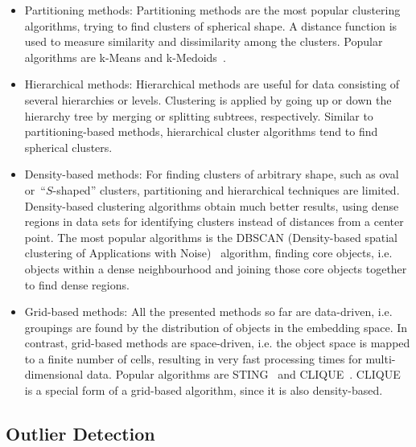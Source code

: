 \begin{itemize} 
\item Partitioning methods: Partitioning methods are the most popular clustering algorithms, trying to find clusters of spherical shape. A distance function is used to measure similarity and dissimilarity among the clusters. Popular algorithms are k-Means and k-Medoids~\parencite{medoid}. 
\item Hierarchical methods: Hierarchical methods are useful for data consisting of several hierarchies or levels. Clustering is applied by going up or down the hierarchy tree by merging or splitting subtrees, respectively. Similar to partitioning-based methods, hierarchical cluster algorithms tend to find spherical clusters. 
\item Density-based methods: For finding clusters of arbitrary shape, such as oval or~\enquote{$S$-shaped} clusters, partitioning and hierarchical techniques are limited. Density-based clustering algorithms obtain much better results, using dense regions in data sets for identifying clusters instead of distances from a center point. The most popular algorithms is the DBSCAN (Density-based spatial clustering of Applications with Noise)~\parencite{dbscan} algorithm, finding core objects, i.e. objects within a dense neighbourhood and joining those core objects together to find dense regions.
\item Grid-based methods: All the presented methods so far are data-driven, i.e. groupings are found by the distribution of objects in the embedding space. In contrast, grid-based methods are space-driven, i.e. the object space is mapped to a finite number of cells, resulting in very fast processing times for multi-dimensional data. Popular algorithms are STING~\parencite{sting} and CLIQUE~\parencite{clique}. CLIQUE is a special form of a grid-based algorithm, since it is also density-based.
\end{itemize}





\subsection{Outlier Detection}

